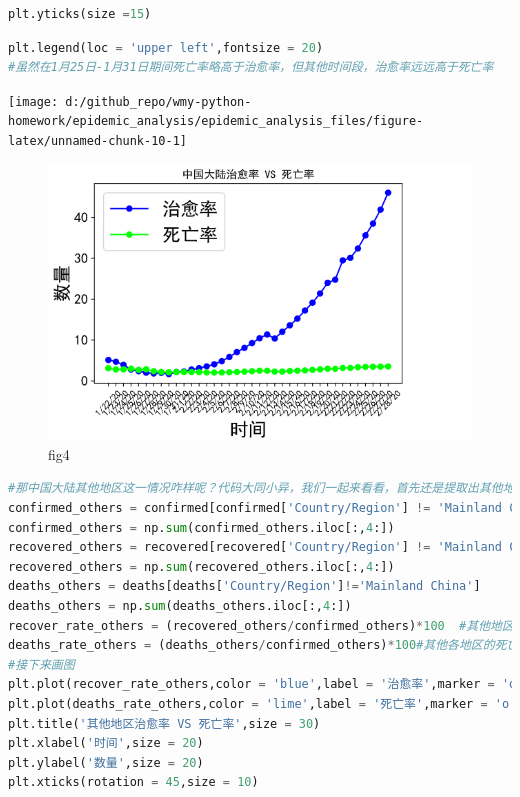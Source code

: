 \documentclass[UTF8,a4paper,12pt]{ctexart}  %
\begin{document}
\begin{lstlisting}[language=Python]
plt.yticks(size =15)
\end{lstlisting}

\begin{lstlisting}[language=Python]
plt.legend(loc = 'upper left',fontsize = 20)
#虽然在1月25日-1月31日期间死亡率略高于治愈率，但其他时间段，治愈率远远高于死亡率
\end{lstlisting}

\begin{center}\texttt{[image: d:/github\_repo/wmy-python-homework/epidemic\_analysis/epidemic\_analysis\_files/figure-latex/unnamed-chunk-10-1]} \end{center}

\begin{figure}
\centering
\includegraphics{./fig4.png}
\caption{fig4}
\end{figure}

\begin{lstlisting}[language=Python]
#那中国大陆其他地区这一情况咋样呢？代码大同小异，我们一起来看看，首先还是提取出其他地区的数据。
confirmed_others = confirmed[confirmed['Country/Region'] != 'Mainland China']
confirmed_others = np.sum(confirmed_others.iloc[:,4:])
recovered_others = recovered[recovered['Country/Region'] != 'Mainland China']
recovered_others = np.sum(recovered_others.iloc[:,4:])
deaths_others = deaths[deaths['Country/Region']!='Mainland China']
deaths_others = np.sum(deaths_others.iloc[:,4:])
recover_rate_others = (recovered_others/confirmed_others)*100  #其他地区的治愈率
deaths_rate_others = (deaths_others/confirmed_others)*100#其他各地区的死亡率
#接下来画图
plt.plot(recover_rate_others,color = 'blue',label = '治愈率',marker = 'o')
plt.plot(deaths_rate_others,color = 'lime',label = '死亡率',marker = 'o')
plt.title('其他地区治愈率 VS 死亡率',size = 30)
plt.xlabel('时间',size = 20)
plt.ylabel('数量',size = 20)
plt.xticks(rotation = 45,size = 10)
\end{lstlisting}
\end{document}
